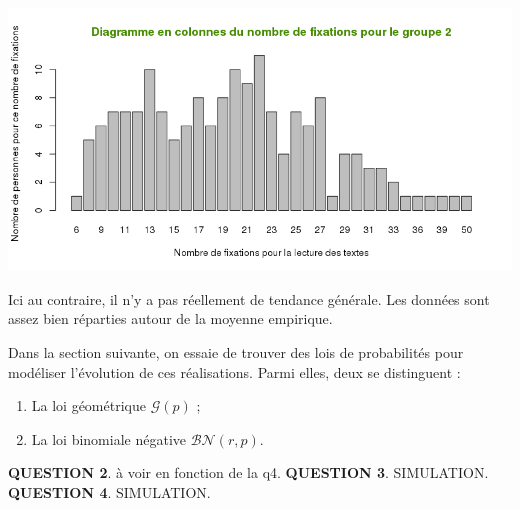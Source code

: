 \documentclass[a4paper,11pt]{article}
\newcommand{\quest}[1]{\small\textbf{#1}\normalsize}
\theoremstyle{nonumberplain}
\theoremstyle{nonumberplain}
\theoremstyle{nonumberplain}
\theoremstyle{nonumberplain}
\begin{document}
      \begin{center}
          \includegraphics[scale=0.75]{images/p2_q1_2.png}
      \end{center}

      Ici au contraire, il n'y a pas réellement de tendance générale. Les données
      sont assez bien réparties autour de la moyenne empirique.

      \medskip
      Dans la section suivante, on essaie de trouver des lois de probabilités pour
      modéliser l'évolution de ces réalisations. Parmi elles, deux se distinguent :

      \begin{enumerate}
          \item La loi géométrique $\mathcal{G}(p)$ ;
          \item La loi binomiale négative $\mathcal{BN}(r, p)$.
      \end{enumerate}

      \vspace{8cm}
      \quest{QUESTION 2}. à voir en fonction de la q4.
      \quest{QUESTION 3}. SIMULATION.
      \quest{QUESTION 4}. SIMULATION.
\end{document}

